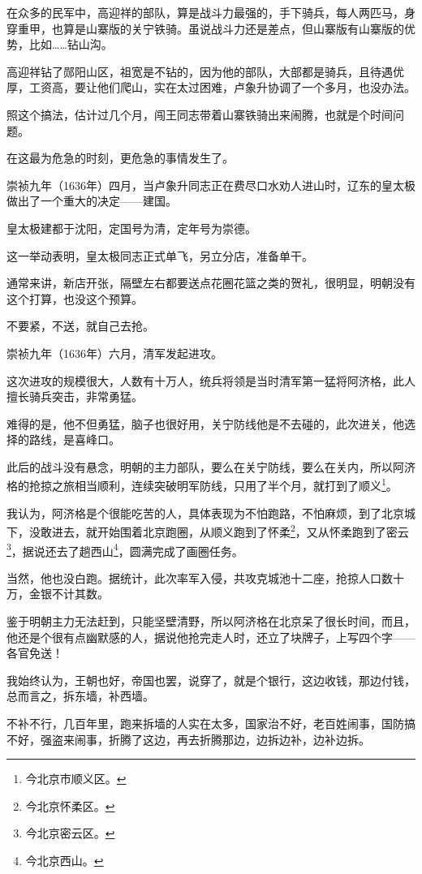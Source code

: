 \begin{multicols}{\theparacolNo}
在众多的民军中，高迎祥的部队，算是战斗力最强的，手下骑兵，每人两匹马，身穿重甲，也算是山寨版的关宁铁骑。虽说战斗力还是差点，但山寨版有山寨版的优势，比如……钻山沟。

高迎祥钻了郧阳山区，祖宽是不钻的，因为他的部队，大部都是骑兵，且待遇优厚，工资高，要让他们爬山，实在太过困难，卢象升协调了一个多月，也没办法。

照这个搞法，估计过几个月，闯王同志带着山寨铁骑出来闹腾，也就是个时间问题。

在这最为危急的时刻，更危急的事情发生了。

崇祯九年（1636年）四月，当卢象升同志正在费尽口水劝人进山时，辽东的皇太极做出了一个重大的决定——建国。

皇太极建都于沈阳，定国号为清，定年号为崇德。

这一举动表明，皇太极同志正式单飞，另立分店，准备单干。

通常来讲，新店开张，隔壁左右都要送点花圈花篮之类的贺礼，很明显，明朝没有这个打算，也没这个预算。

不要紧，不送，就自己去抢。

崇祯九年（1636年）六月，清军发起进攻。

这次进攻的规模很大，人数有十万人，统兵将领是当时清军第一猛将阿济格，此人擅长骑兵突击，非常勇猛。

难得的是，他不但勇猛，脑子也很好用，关宁防线他是不去碰的，此次进关，他选择的路线，是喜峰口。

此后的战斗没有悬念，明朝的主力部队，要么在关宁防线，要么在关内，所以阿济格的抢掠之旅相当顺利，连续突破明军防线，只用了半个月，就打到了顺义\footnote{今北京市顺义区。}。

我认为，阿济格是个很能吃苦的人，具体表现为不怕跑路，不怕麻烦，到了北京城下，没敢进去，就开始围着北京跑圈，从顺义跑到了怀柔\footnote{今北京怀柔区。}，又从怀柔跑到了密云\footnote{今北京密云区。}，据说还去了趟西山\footnote{今北京西山。}，圆满完成了画圈任务。

当然，他也没白跑。据统计，此次率军入侵，共攻克城池十二座，抢掠人口数十万，金银不计其数。

鉴于明朝主力无法赶到，只能坚壁清野，所以阿济格在北京呆了很长时间，而且，他还是个很有点幽默感的人，据说他抢完走人时，还立了块牌子，上写四个字——各官免送！

我始终认为，王朝也好，帝国也罢，说穿了，就是个银行，这边收钱，那边付钱，总而言之，拆东墙，补西墙。

不补不行，几百年里，跑来拆墙的人实在太多，国家治不好，老百姓闹事，国防搞不好，强盗来闹事，折腾了这边，再去折腾那边，边拆边补，边补边拆。


\end{multicols}
